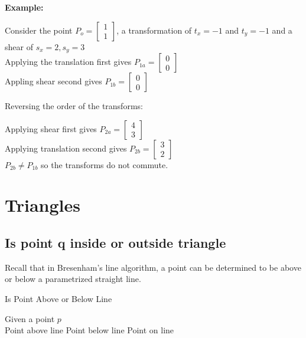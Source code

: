 \documentclass[a4paper,10pt]{scrartcl}
\begin{document}
{\bfseries{Example:}}

Consider the point $P_o = \begin{bmatrix} 1 \\ 1 \end{bmatrix}$, a transformation of $t_x = -1$ and $t_y = -1$ and a shear of $s_x = 2, s_y = 3$\\
Applying the translation first gives $P_{1a} = \begin{bmatrix} 0 \\ 0 \end{bmatrix}$ \\ 
Appling shear second gives $P_{1b} = \begin{bmatrix} 0 \\ 0 \end{bmatrix}$

Reversing the order of the transforms:

Applying shear first gives $P_{2a} = \begin{bmatrix} 4 \\ 3 \end{bmatrix}$ \\
Applying translation second gives  $P_{2b} = \begin{bmatrix} 3 \\ 2 \end{bmatrix}$ \\

$P_{2b} \neq P_{1b}$ so the transforms do not commute.

\section{Triangles}

\subsection{Is point q inside or outside triangle}

Recall that in Bresenham's line algorithm, a point can be determined to be above or below a parametrized straight line.

\begin{algorithm}
  \caption{Is Point Above or Below Line}\label{}
  
  \begin{algorithmic}

    \State Given a point $p$
    \\
    \State Point above line
    \State   Point below line
    \Else 
    \State Point on line
    \EndIf\\
    
  \end{algorithmic}
\end{algorithm}
\end{document}
